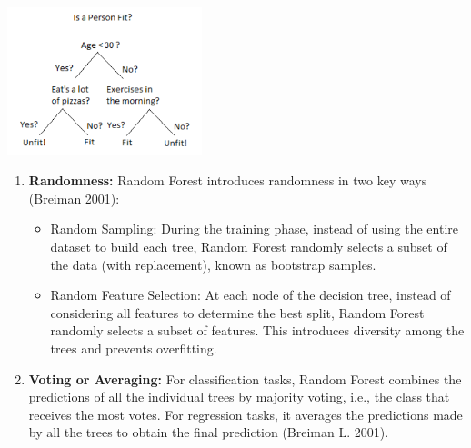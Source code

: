 \includegraphics[width=2.22832in,height=1.69421in]{figs/tree.png}

\begin{enumerate}
\def\labelenumi{\alph{enumi}.}
\setcounter{enumi}{1}
\item
  \textbf{Randomness:} Random Forest introduces randomness in two key
  ways (Breiman 2001):

  \begin{itemize}
  \item
    Random Sampling: During the training phase, instead of using the
    entire dataset to build each tree, Random Forest randomly selects a
    subset of the data (with replacement), known as bootstrap samples.
  \item
    Random Feature Selection: At each node of the decision tree, instead
    of considering all features to determine the best split, Random
    Forest randomly selects a subset of features. This introduces
    diversity among the trees and prevents overfitting.
  \end{itemize}
\item
  \textbf{Voting or Averaging:} For classification tasks, Random Forest
  combines the predictions of all the individual trees by majority
  voting, i.e., the class that receives the most votes. For regression
  tasks, it averages the predictions made by all the trees to obtain the
  final prediction (Breiman L. 2001).
\end{enumerate}

